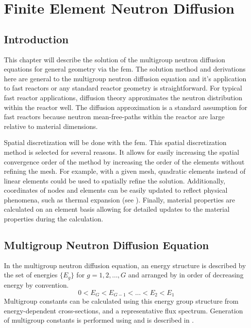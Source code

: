 \chapter{Finite Element Neutron Diffusion}
\label{ch:neutronDiffusion}

\section{Introduction}
  This chapter will describe the solution of the multigroup neutron diffusion 
  equations for general geometry via the \gls{fem}. The solution method and 
  derivations here are general to the multigroup neutron diffusion equation and 
  it's application to fast reactors or any standard reactor geometry is 
  straightforward. For typical fast reactor applications, diffusion theory 
  approximates the neutron distribution within the reactor well. The diffusion 
  approximation is a standard assumption for fast reactors because neutron 
  mean-free-paths within the reactor are large relative to material dimensions.

  Spatial discretization will be done with the \gls{fem}. This spatial 
  discretization method is selected for several reasons. It allows for easily 
  increasing the spatial convergence order of the method by increasing the order
  of the elements without refining the mesh. For example, with a given mesh, 
  quadratic elements instead of linear elements could be used to spatially 
  refine the solution. Additionally, coordinates of nodes and elements can be 
  easily updated to reflect physical phenomena, such as thermal expansion (see 
  ). Finally, material properties are calculated on 
  an element basis allowing for detailed updates to the material properties 
  during the calculation.

\section{Multigroup Neutron Diffusion Equation}
  In the multigroup neutron diffusion equation, an energy structure is 
  described by the set of energies $\{E_g\}$ for $g = 1,2,\ldots,G$ and arranged 
  by in order of decreasing energy by convention.
  \begin{equation}
    0 < E_G < E_{G-1} < \ldots < E_2 < E_1
  \end{equation}
  Multigroup constants can be calculated using this energy group 
  structure from energy-dependent cross-sections, and a representative flux 
  spectrum. Generation of multigroup constants is performed using \mcc and is 
  described in .

